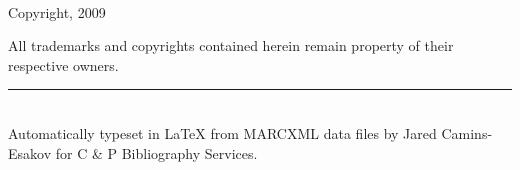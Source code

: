 % 
% 
{\small
~\\[4cm]

\begin{center}
Copyright, 2009\\[2cm]
\end{center}

\begin{flushleft}
All trademarks and copyrights contained herein remain property of their respective owners.

\vfill

\rule{6cm}{0.25mm}\\[0.2cm]
Automatically typeset in {\LaTeX} from MARCXML data files by Jared Camins-Esakov for C \& P Bibliography Services.
\end{flushleft}
}

